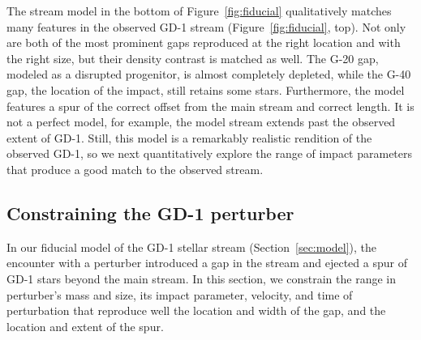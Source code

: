 \documentclass[twocolumn]{aastex62}
\begin{document}
The stream model in the bottom of Figure~\ref{fig:fiducial} qualitatively matches many features in the observed GD-1 stream (Figure~\ref{fig:fiducial}, top).
Not only are both of the most prominent gaps reproduced at the right location and with the right size, but their density contrast is matched as well.
The G-20 gap, modeled as a disrupted progenitor, is almost completely depleted, while the G-40 gap, the location of the impact, still retains some stars.
Furthermore, the model features a spur of the correct offset from the main stream and correct length.
It is not a perfect model, for example, the model stream extends past the observed extent of GD-1.
Still, this model is a remarkably realistic rendition of the observed GD-1, so we next quantitatively explore the range of impact parameters that produce a good match to the observed stream.

\subsection{Constraining the GD-1 perturber}
\label{sec:perturber_properties}
In our fiducial model of the GD-1 stellar stream (Section~\ref{sec:model}), the encounter with a perturber introduced a gap in the stream and ejected a spur of GD-1 stars beyond the main stream.
In this section, we constrain the range in perturber's mass and size, its impact parameter, velocity, and time of perturbation that reproduce well the location and width of the gap, and the location and extent of the spur.
\end{document}
